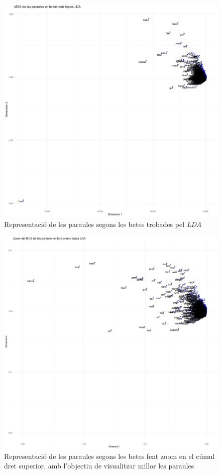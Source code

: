 \begin{figure}[H]
    \centering
    \includegraphics[width=0.95\linewidth]{Images/8_Textual/LDA/MDS_paraules_full.png}
    \caption{Representació de les paraules segons les betes trobades pel \textit{LDA}}
    \label{fig:LDA:MDS_paraules_full}
\end{figure}


\begin{figure}[H]
    \centering
    \includegraphics[width=0.95\linewidth]{Images/8_Textual/LDA/MDS_paraules_zoom.png}
    \caption{Representació de les paraules segons les betes fent zoom en el cúmul dret superior, amb l'objectiu de visualitzar millor les paraules}
    \label{fig:LDA:MDS_paraules_zoom}
\end{figure}

